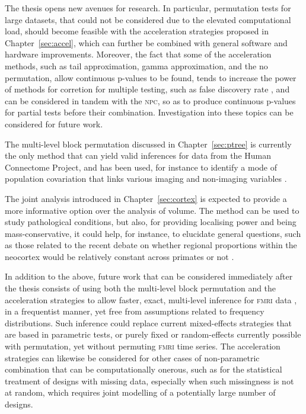 The thesis opens new avenues for research. In particular, permutation tests for large datasets, that could not be considered due to the elevated computational load, should become feasible with the acceleration strategies proposed in Chapter~\ref{sec:accel}, which can further be combined with general software and hardware improvements. Moreover, the fact that some of the acceleration methods, such as tail approximation, gamma approximation, and the no permutation, allow continuous p-values to be found, tends to increase the power of methods for corretion for multiple testing, such as false discovery rate \citep[\textsc{fdr};][]{Genovese2002}, and can be considered in tandem with the \textsc{npc}, so as to produce continuous p-values for partial tests before their combination. Investigation into these topics can be considered for future work.

The multi-level block permutation discussed in Chapter~\ref{sec:ptree} is currently the only method that can yield valid inferences for data from the Human Connectome Project, and has been used, for instance to identify a mode of population covariation that links various imaging and non-imaging variables \citep{Smith2015}.

The joint analysis introduced in Chapter~\ref{sec:cortex} is expected to provide a more informative option over the analysis of volume. The method can be used to study pathological conditions, but also, for providing localising power and being mass-con\-ser\-va\-ti\-ve, it could help, for instance, to elucidate general questions, such as those related to the recent debate on whether regional proportions within the neocortex would be relatively constant across primates or not \citep{Schoenemann2005, Barton2013, Gabi2016}. 

In addition to the above, future work that can be considered immediately after the thesis consists of using both the multi-level block permutation and the acceleration strategies to allow faster, exact, multi-level inference for \textsc{fmri} data \citep{Woolrich2004}, in a frequentist manner, yet free from assumptions related to frequency distributions. Such inference could replace current mixed-effects strategies that are based in parametric tests, or purely fixed or random-effects currently possible with permutation, yet without permuting \textsc{fmri} time series. The acceleration strategies can likewise be considered for other cases of non-parametric combination that can be computationally onerous, such as for the statistical treatment of designs with missing data, especially when such missingness is not at random, which requires joint modelling of a potentially large number of designs.

